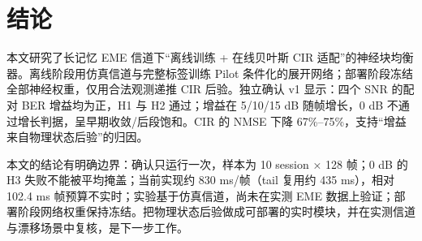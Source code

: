 \section{结论}

本文研究了长记忆 EME 信道下“离线训练 + 在线贝叶斯 CIR 适配”的神经块均衡器。离线阶段用仿真信道与完整标签训练 Pilot 条件化的展开网络；部署阶段冻结全部神经权重，仅用合法观测递推 CIR 后验。独立确认 v1 显示：四个 SNR 的配对 BER 增益均为正，H1 与 H2 通过；增益在 5/10/15 dB 随帧增长，0 dB 不通过增长判据，呈早期收敛/后段饱和。CIR 的 NMSE 下降 67\%–75\%，支持“增益来自物理状态后验”的归因。

本文的结论有明确边界：确认只运行一次，样本为 10 session × 128 帧；0 dB 的 H3 失败不能被平均掩盖；当前实现约 830 ms/帧（tail 复用约 435 ms），相对 102.4 ms 帧预算不实时；实验基于仿真信道，尚未在实测 EME 数据上验证；部署阶段网络权重保持冻结。把物理状态后验做成可部署的实时模块，并在实测信道与漂移场景中复核，是下一步工作。

